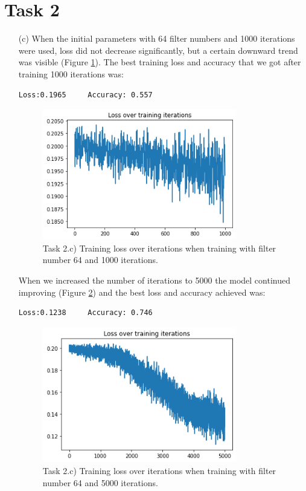 \documentclass [a4paper, 11pt] {article}
\begin{document}
\section*{Task 2}
\begin{enumerate}
\item[(c)]
When the initial parameters with 64 filter numbers and 1000 iterations were used, loss did not decrease significantly, but a certain downward trend was visible (Figure \ref{fig:64-1000}). The best training loss and accuracy that we got after training 1000 iterations was:
\begin{lstlisting}
Loss:0.1965 	Accuracy: 0.557
\end{lstlisting}

\begin{figure}[!h]
	\centering
	\includegraphics[width=0.8\textwidth]{img/64-1000.png}
	\caption{Task 2.c) Training loss over iterations when training with filter number 64 and 1000 iterations.}
	\label{fig:64-1000}
\end{figure}

When we increased the number of iterations to 5000 the model continued improving (Figure \ref{fig:64-5000}) and the best loss and accuracy achieved was:
\begin{lstlisting}
Loss:0.1238 	Accuracy: 0.746
\end{lstlisting}
\begin{figure}[!h]
	\centering
	\includegraphics[width=0.8\textwidth]{img/64-5000.png}
	\caption{Task 2.c) Training loss over iterations when training with filter number 64 and 5000 iterations.}
	\label{fig:64-5000}
\end{figure}


\end{enumerate}
\end{document}

